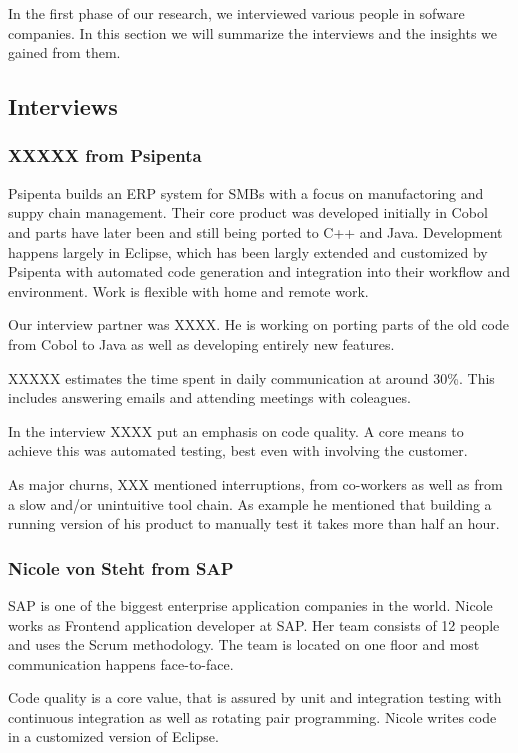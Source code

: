 In the first phase of our research, we interviewed various people in sofware companies. In this section we will summarize the interviews and the insights we gained from them.

\subsection{Interviews}
\subsubsection{XXXXX from Psipenta}
Psipenta builds an ERP system for SMBs with a focus on manufactoring and suppy chain management. Their core product was developed initially in Cobol and parts have later been and still being ported to C++ and Java. Development happens largely in Eclipse, which has been largly extended and customized by Psipenta with automated code generation and integration into their workflow and environment. Work is flexible with home and remote work.

Our interview partner was XXXX. He is working on porting parts of the old code from Cobol to Java as well as developing entirely new features.

XXXXX estimates the time spent in daily communication at around 30\%. This includes answering emails and attending meetings with coleagues.

In the interview XXXX put an emphasis on code quality. A core means to achieve this was automated testing, best even with involving the customer.

As major churns, XXX mentioned interruptions, from co-workers as well as from a slow and/or unintuitive tool chain. As example he mentioned that building a running version of his product to manually test it takes more than half an hour.

\subsubsection{Nicole von Steht from SAP}
SAP is one of the biggest enterprise application companies in the world. Nicole works as Frontend application developer at SAP. Her team consists of 12 people and uses the Scrum methodology. The team is located on one floor and most communication happens face-to-face.

Code quality is a core value, that is assured by unit and integration testing with continuous integration as well as rotating pair programming. Nicole writes code in a customized version of Eclipse.

